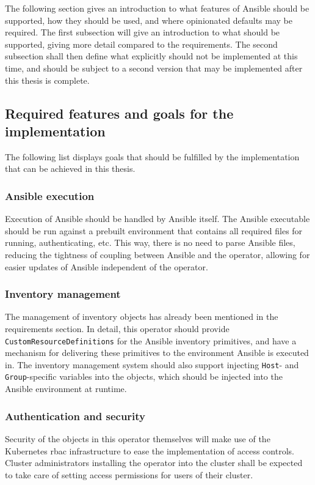 The following section gives an introduction to what features of Ansible should be supported, how they should be used, and where opinionated defaults may be required.
The first subsection will give an introduction to what should be supported, giving more detail compared to the requirements.
The second subsection shall then define what explicitly should not be implemented at this time, and should be subject to a second version that may be implemented after this thesis is complete.

\clearpage
\subsection{Required features and goals for the implementation}
The following list displays goals that should be fulfilled by the implementation that can be achieved in this thesis.

\subsubsection{Ansible execution}
Execution of Ansible should be handled by Ansible itself.
The Ansible executable should be run against a prebuilt environment that contains all required files for running, authenticating, etc.
This way, there is no need to parse Ansible files, reducing the tightness of coupling between Ansible and the operator, allowing for easier updates of Ansible independent of the operator.

\subsubsection{Inventory management}
The management of inventory objects has already been mentioned in the requirements section. In detail, this operator should provide \texttt{CustomResourceDefinitions} for the Ansible inventory primitives, and have a mechanism for delivering these primitives to the environment Ansible is executed in.
The inventory management system should also support injecting \texttt{Host}- and \texttt{Group}-specific variables into the objects, which should be injected into the Ansible environment at runtime.

\subsubsection{Authentication and security}
Security of the objects in this operator themselves will make use of the Kubernetes \gls{rbac} infrastructure to ease the implementation of access controls. Cluster administrators installing the operator into the cluster shall be expected to take care of setting access permissions for users of their cluster.

